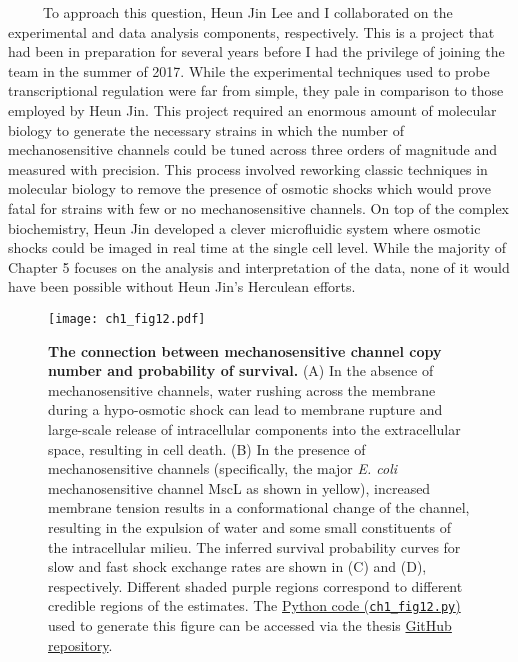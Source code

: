 \documentclass[12pt]{caltech_thesis}
\begin{document}
~~~~~To approach this question, Heun Jin Lee and I collaborated on the
experimental and data analysis components, respectively. This is a
project that had been in preparation for several years before I had the
privilege of joining the team in the summer of 2017. While the
experimental techniques used to probe transcriptional regulation were
far from simple, they pale in comparison to those employed by Heun Jin.
This project required an enormous amount of molecular biology to
generate the necessary strains in which the number of mechanosensitive
channels could be tuned across three orders of magnitude and measured
with precision. This process involved reworking classic techniques in
molecular biology to remove the presence of osmotic shocks which would
prove fatal for strains with few or no mechanosensitive channels. On top
of the complex biochemistry, Heun Jin developed a clever microfluidic
system where osmotic shocks could be imaged in real time at the single
cell level. While the majority of Chapter 5 focuses on the analysis and
interpretation of the data, none of it would have been possible without
Heun Jin's Herculean efforts.

\hypertarget{fig:mscl_intro}{%
\begin{figure}
\centering
\texttt{[image: ch1\_fig12.pdf]}
\caption[{The connection between mechanosensitive channel number and
probability of survival.}]{\textbf{The connection between
mechanosensitive channel copy number and probability of survival.} (A)
In the absence of mechanosensitive channels, water rushing across the
membrane during a hypo-osmotic shock can lead to membrane rupture and
large-scale release of intracellular components into the extracellular
space, resulting in cell death. (B) In the presence of mechanosensitive
channels (specifically, the major \emph{E. coli} mechanosensitive
channel MscL as shown in yellow), increased membrane tension results in
a conformational change of the channel, resulting in the expulsion of
water and some small constituents of the intracellular milieu. The
inferred survival probability curves for slow and fast shock exchange
rates are shown in (C) and (D), respectively. Different shaded purple
regions correspond to different credible regions of the estimates. The
\href{https://github.com/gchure/phd/blob/master/src/chapter_01/code/ch1_fig12.py}{Python
code (\texttt{ch1\_fig12.py})} used to generate this figure can be
accessed via the thesis \href{https://github.com/gchure/phd}{GitHub
repository}.}
\label{fig:mscl_intro}
\end{figure}
}
\end{document}
